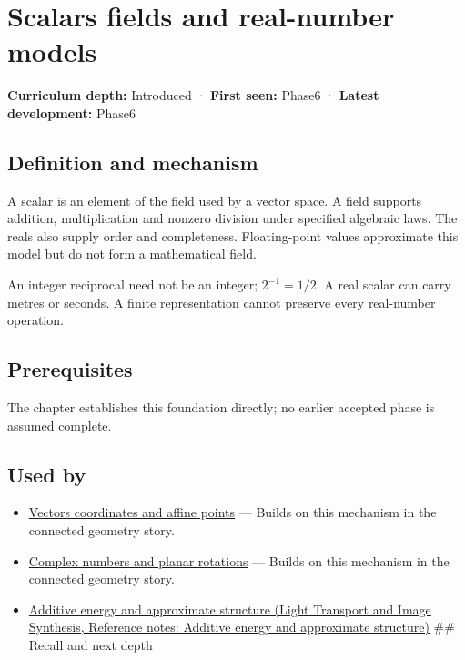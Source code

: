 \hypertarget{appendix-52051ad550fe}{}\label{referencestart:appendix-52051ad550fe}
\section{Scalars fields and real-number models}\label{appendix-52051ad550fe-scalars-fields-and-real-number-models}

\textbf{Curriculum depth:} Introduced · \textbf{First seen:} Phase6 · \textbf{Latest development:} Phase6

\subsection{Definition and mechanism}\label{appendix-52051ad550fe-definition-and-mechanism}

A scalar is an element of the field used by a vector space. A field supports addition, multiplication and nonzero division under specified algebraic laws. The reals also supply order and completeness. Floating-point values approximate this model but do not form a mathematical field.

An integer reciprocal need not be an integer; \(2^{-1}=1/2\). A real scalar can carry metres or seconds. A finite representation cannot preserve every real-number operation.

\subsection{Prerequisites}\label{appendix-52051ad550fe-prerequisites}

The chapter establishes this foundation directly; no earlier accepted phase is assumed complete.

\subsection{Used by}\label{appendix-52051ad550fe-used-by}

\begin{itemize}
\item
  \hyperref[appendix-0659864c0aa3]{Vectors coordinates and affine points} --- Builds on this mechanism in the connected geometry story.
\item
  \hyperref[appendix-f77eadcc4a93]{Complex numbers and planar rotations} --- Builds on this mechanism in the connected geometry story.
\item
  \href{../04-Light-Transport-and-Image-Synthesis/main.pdf\#nameddest=appendix-b0732b22e7d6}{Additive energy and approximate structure (Light Transport and Image Synthesis, Reference notes: Additive energy and approximate structure)} \#\# Recall and next depth
\end{itemize}

